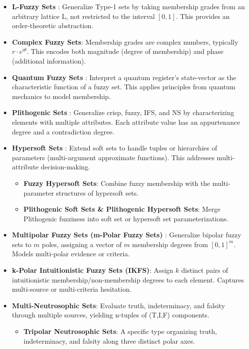\begin{itemize}
    \item \textbf{L-Fuzzy Sets} \cite{Goguen1967}: Generalize Type-1 sets by taking membership grades from an arbitrary lattice L, not restricted to the interval $[0,1]$. This provides an order-theoretic abstraction.

    \item \textbf{Complex Fuzzy Sets}: Membership grades are complex numbers, typically $r \cdot e^{i\theta}$. This encodes both magnitude (degree of membership) and phase (additional information).

    \item \textbf{Quantum Fuzzy Sets} \cite{Pykacz2015_Quantum}: Interpret a quantum register's state-vector as the characteristic function of a fuzzy set. This applies principles from quantum mechanics to model membership.

    \item \textbf{Plithogenic Sets} \cite{Smarandache2018_Plithogenic}: Generalize crisp, fuzzy, IFS, and NS by characterizing elements with multiple attributes. Each attribute value has an appurtenance degree and a contradiction degree.

    \item \textbf{Hypersoft Sets} \cite{Smarandache2018_Hypersoft}: Extend soft sets to handle tuples or hierarchies of parameters (multi-argument approximate functions). This addresses multi-attribute decision-making.
    \begin{itemize}
        \item \textbf{Fuzzy Hypersoft Sets}: Combine fuzzy membership with the multi-parameter structures of hypersoft sets.
        \item \textbf{Plithogenic Soft Sets \& Plithogenic Hypersoft Sets}: Merge Plithogenic fuzziness into soft set or hypersoft set parameterizations.
    \end{itemize}

    \item \textbf{Multipolar Fuzzy Sets (m-Polar Fuzzy Sets)} \cite{Chen2014_mPolar}: Generalize bipolar fuzzy sets to $m$ poles, assigning a vector of $m$ membership degrees from $[0,1]^m$. Models multi-polar evidence or criteria.

    \item \textbf{k-Polar Intuitionistic Fuzzy Sets (IKFS)}: Assign $k$ distinct pairs of intuitionistic membership/non-membership degrees to each element. Captures multi-source or multi-criteria hesitation.

    \item \textbf{Multi-Neutrosophic Sets}: Evaluate truth, indeterminacy, and falsity through multiple sources, yielding n-tuples of (T,I,F) components.
    \begin{itemize}
        \item \textbf{Tripolar Neutrosophic Sets}: A specific type organizing truth, indeterminacy, and falsity along three distinct polar axes.
    \end{itemize}


\end{itemize}
